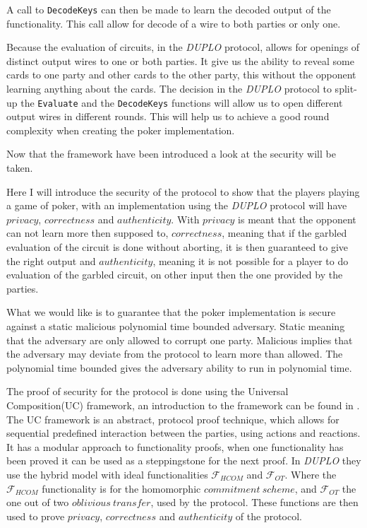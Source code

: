 \documentclass[twoside,11pt,openright]{report}
\newcommand{\DUPLO}{\textit{DUPLO} }
\begin{document}
A call to \verb|DecodeKeys| can then be made to learn the decoded output of the functionality. This call allow for decode of a wire to both parties or only one.

\bigskip

Because the evaluation of circuits, in the \DUPLO protocol, allows for openings of distinct output wires to one or both parties. It give us the ability to reveal some cards to one party and other cards to the other party, this without the opponent learning anything about the cards. The decision in the \DUPLO protocol to split-up the \verb|Evaluate| and the \verb|DecodeKeys| functions will allow us to open different output wires in different rounds. This will help us to achieve a good round complexity when creating the poker implementation.

\bigskip

Now that the framework have been introduced a look at the security will be taken.

Here I will introduce the security of the protocol to show that the players playing a game of poker, with an implementation using the \DUPLO protocol will have $privacy$, $correctness$ and $authenticity$. With $privacy$ is meant that the opponent can not learn more then supposed to, $correctness$, meaning that if the garbled evaluation of the circuit is done without aborting, it is then guaranteed to give the right output and $authenticity$, meaning it is not possible for a player to do evaluation of the garbled circuit, on other input then the one provided by the parties.

What we would like is to guarantee that the poker implementation is secure against a static malicious polynomial time bounded adversary. Static meaning that the adversary are only allowed to corrupt one party. Malicious implies that the adversary may deviate from the protocol to learn more than allowed. The polynomial time bounded gives the adversary ability to run in polynomial time.

\bigskip

The proof of security for the protocol is done using the Universal Composition(UC) framework, an introduction to the framework can be found in \cite{smcss}. The UC framework is an abstract, protocol proof technique, which allows for sequential predefined interaction between the parties, using actions and reactions. It has a modular approach to functionality proofs, when one functionality has been proved it can be used as a steppingstone for the next proof. In \DUPLO they use the hybrid model with ideal functionalities $\mathcal{F}_{HCOM}$ and $\mathcal{F}_{OT}$. Where the $\mathcal{F}_{HCOM}$ functionality is for the homomorphic $commitment~scheme$, and $\mathcal{F}_{OT}$ the one out of two $oblivious~transfer$, used by the protocol. These functions are then used to prove $privacy$, $correctness$ and $authenticity$ of the protocol. 
\end{document}
